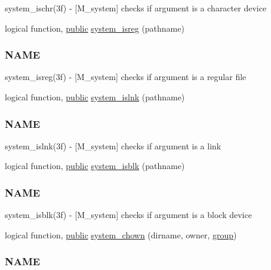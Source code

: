 \begin{DoxyCompactItemize}
\begin{DoxyCompactList}
system\+\_\+ischr(3f) -\/ \mbox{[}M\+\_\+system\mbox{]} checks if argument is a character device \end{DoxyCompactList}\item 
logical function, \hyperlink{M__stopwatch_83_8txt_a2f74811300c361e53b430611a7d1769f}{public} \hyperlink{namespacem__system_a127bdd84ccd4b52f3f29abbc56af029b}{system\+\_\+isreg} (pathname)
\begin{DoxyCompactList}\small\item\em \subsubsection*{N\+A\+ME}

system\+\_\+isreg(3f) -\/ \mbox{[}M\+\_\+system\mbox{]} checks if argument is a regular file \end{DoxyCompactList}\item 
logical function, \hyperlink{M__stopwatch_83_8txt_a2f74811300c361e53b430611a7d1769f}{public} \hyperlink{namespacem__system_ab05694cc3d76a3ecc87e4b4490c4c217}{system\+\_\+islnk} (pathname)
\begin{DoxyCompactList}\small\item\em \subsubsection*{N\+A\+ME}

system\+\_\+islnk(3f) -\/ \mbox{[}M\+\_\+system\mbox{]} checks if argument is a link \end{DoxyCompactList}\item 
logical function, \hyperlink{M__stopwatch_83_8txt_a2f74811300c361e53b430611a7d1769f}{public} \hyperlink{namespacem__system_a791fa587005ec07cbcd7b0045ee6f43f}{system\+\_\+isblk} (pathname)
\begin{DoxyCompactList}\small\item\em \subsubsection*{N\+A\+ME}

system\+\_\+isblk(3f) -\/ \mbox{[}M\+\_\+system\mbox{]} checks if argument is a block device \end{DoxyCompactList}\item 
logical function, \hyperlink{M__stopwatch_83_8txt_a2f74811300c361e53b430611a7d1769f}{public} \hyperlink{namespacem__system_a3353c1cff032fcfe2985a69f10038ddd}{system\+\_\+chown} (dirname, owner, \hyperlink{M__stopwatch_83_8txt_a80fa32a76a22835e3c85462b2803875c}{group})
\begin{DoxyCompactList}\small\item\em \subsubsection*{N\+A\+ME}


\end{DoxyCompactList}
\end{DoxyCompactItemize}

